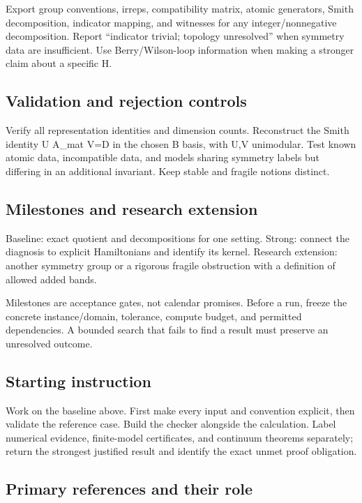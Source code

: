 \documentclass[
  11pt,
]{article}
\begin{document}
Export group conventions, irreps, compatibility matrix, atomic
generators, Smith decomposition, indicator mapping, and witnesses for
any integer/nonnegative decomposition. Report ``indicator trivial;
topology unresolved'' when symmetry data are insufficient. Use
Berry/Wilson-loop information when making a stronger claim about a
specific H.

\subsection{Validation and rejection controls}

Verify all representation identities and dimension counts. Reconstruct
the Smith identity U A\_mat V=D in the chosen B basis, with U,V
unimodular. Test known atomic data, incompatible data, and models
sharing symmetry labels but differing in an additional invariant. Keep
stable and fragile notions distinct.

\subsection{Milestones and research extension}

Baseline: exact quotient and decompositions for one setting. Strong:
connect the diagnosis to explicit Hamiltonians and identify its kernel.
Research extension: another symmetry group or a rigorous fragile
obstruction with a definition of allowed added bands.

Milestones are acceptance gates, not calendar promises. Before a run,
freeze the concrete instance/domain, tolerance, compute budget, and
permitted dependencies. A bounded search that fails to find a result
must preserve an unresolved outcome.

\subsection{Starting instruction}

Work on the baseline above. First make every input and convention
explicit, then validate the reference case. Build the checker alongside
the calculation. Label numerical evidence, finite-model certificates,
and continuum theorems separately; return the strongest justified result
and identify the exact unmet proof obligation.

\subsection{Primary references and their role}
\end{document}
